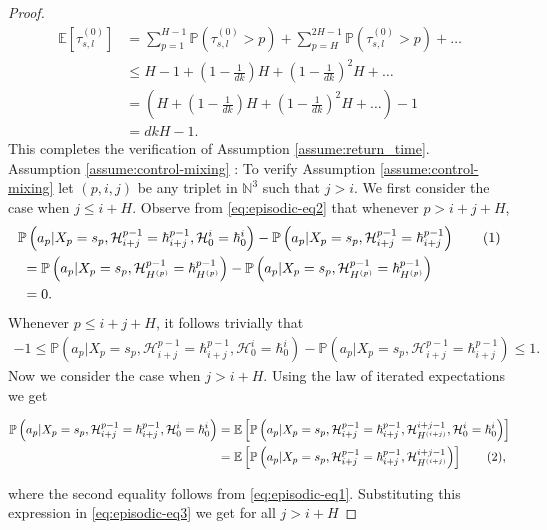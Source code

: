 \documentclass[opre,sglanonrev]{informs4}
\numberwithin{equation}{section}
\newcommand{\pow}[1]{^{(#1)}}
\newcommand{\lp}{\left(}
\newcommand{\rp}{\right)}
\newcommand{\lb}{\left[}
\newcommand{\rb}{\right]}
\newcommand{\History}{\mathcal{H}}
\newcommand{\history}{\hbar}
\newcommand{\Nbb}{\mathbb{N}}
\newcommand{\Pbb}{\mathbb{P}}
\newcommand{\naturalset}{\Nbb}
\newcommand\numberthis{\addtocounter{equation}{1}\tag{\theequation}}
\newcommand{\prob}{\Pbb}
\newcommand{\expec}{\mathbb{E}}
\newcommand{\probl}{\prob}
\begin{document}
\begin{APPENDICES}
\begin{proof}
\begin{align*}
    \expec[\tau_{s,l}\pow{0}] & =  \sum_{p=1}^{H -1} \prob\lp\tau_{s,l}\pow{0}>p\rp + \sum_{p=H }^{2H -1}\prob\lp\tau_{s,l}\pow{0}>p\rp+\dots\\
    & \leq H -1+\lp1-\frac{1}{dk}\rp H +\lp1-\frac{1}{dk}\rp^2H +\dots\\
    & = \lp H +\lp1-\frac{1}{dk}\rp H +\lp1-\frac{1}{dk}\rp^2H +\dots\rp-1\\
    & = dkH -1.
\end{align*}
This completes the verification of Assumption \ref{assume:return_time}.\\
{Assumption \ref{assume:control-mixing} :} To verify Assumption \ref{assume:control-mixing} let $(p,i,j)$ be any triplet in $\naturalset^3$ such that $j>i$. 
We first consider the case when $j\leq i+H $. 
Observe from \cref{eq:episodic-eq2} that whenever $p>i+j+H $,
\begin{align*}
    & \probl\lp a_p|X_p=s_p,\History_{i+j}^{p-1}=\history_{i+j}^{p-1},\History_0^i=\history_{0}^{i}\rp-\probl\lp a_p|X_p=s_p,\History_{i+j}^{p-1}=\history_{i+j}^{p-1}\rp\numberthis\label{eq:episodic-eq3}\\
    &\  = \probl\lp a_p|X_p=s_p,\History_{H \pow{p}}^{p-1}=\history_{H \pow{p}}^{p-1}\rp-\probl\lp a_p|X_p=s_p,\History_{H \pow{p}}^{p-1}=\history_{H \pow{p}}^{p-1}\rp\\
    & \ =0.
\end{align*}
Whenever $p\leq i+j+ H $, it follows trivially that 
\begin{align*}
    -1\leq \probl\lp a_p|X_p=s_p,\History_{i+j}^{p-1}=\history_{i+j}^{p-1},\History_0^i=\history_{0}^{i}\rp-\probl\lp a_p|X_p=s_p,\History_{i+j}^{p-1}=\history_{i+j}^{p-1}\rp\leq 1.
\end{align*}
Now we consider the case when $j>i+H $. 
Using the law of iterated expectations we get
\begin{small}
\begin{align*}
    \probl\lp a_p|X_p=s_p,\History_{i+j}^{p-1} =\history_{i+j}^{p-1},\History_0^i  =\history_{0}^{i}\rp & =\expec\lb \probl\lp a_p|X_p=s_p,\History_{i+j}^{p-1}=\history_{i+j}^{p-1},\History_{H \pow{i+j}}^{i+j-1},\History_0^i=\history_{0}^{i}\rp\rb\\
    & =\expec\lb \probl\lp a_p|X_p=s_p,\History_{i+j}^{p-1}=\history_{i+j}^{p-1},\History_{H \pow{i+j}}^{i+j-1}\rp\rb\numberthis\label{eq:episodic-eq4},
\end{align*}
\end{small}
where the second equality follows from \cref{eq:episodic-eq1}. Substituting this expression in \cref{eq:episodic-eq3} we get for all $j>i+H $ 

\end{proof}
\end{APPENDICES}
\end{document}
